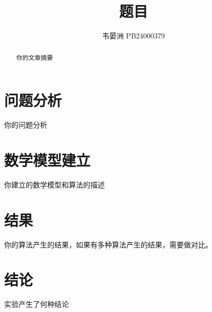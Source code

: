 
\title{\bfseries 题目}
\author{韦晏洲 \quad PB24000379}


	\maketitle
	\begin{abstract}
		你的文章摘要
	\end{abstract}
	\clearpage

	\section{问题分析}
	你的问题分析

	\section{数学模型建立}
	你建立的数学模型和算法的描述 
	
	\section{结果}
	你的算法产生的结果，如果有多种算法产生的结果，需要做对比。
	
	\section{结论}
	实验产生了何种结论  




